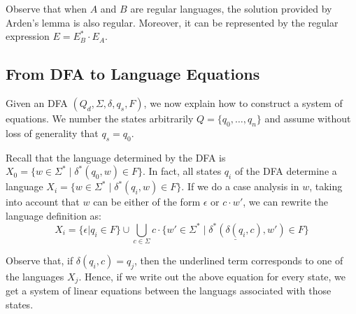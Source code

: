 Observe that when $A$ and $B$ are regular languages, the solution provided by Arden's lemma is
also regular. Moreover, it can be represented by the regular expression $E = E_B^* \cdot E_A$.

\subsection{From DFA to Language Equations}

Given an DFA $(Q_d,\Sigma,\delta,q_{s},F)$, we now explain how to construct a system of equations.
We number the states arbitrarily $Q = \{ q_0, \ldots, q_n\}$ and assume without loss of generality
that $q_s = q_0$.

Recall that the language determined by the DFA is $X_0 = \{ w \in \Sigma^* \mid \delta^*(q_0, w) \in F\}$.
In fact, all states $q_i$ of the DFA determine a language $X_i = \{ w \in \Sigma^* \mid \delta^*(q_i, w) \in F\}$.
If we do a case analysis in $w$, taking into account that $w$ can be either of the form $\epsilon$ or $c \cdot w'$,
we can rewrite the language definition as:
\begin{equation*}
X_i = \{ \epsilon | q_i \in F\} \cup \bigcup_{c \in \Sigma} c \cdot \underline{\{  w ' \in \Sigma^* \mid \delta^*(\delta(q_i,c), w') \in F\}}
\end{equation*}

Observe that, if $\delta(q_i,c) = q_j$, then the underlined term corresponds to one of the languages $X_j$. Hence,
if we write out the above equation for every state, we get a system of linear equations between the languags
associated with those states. 

